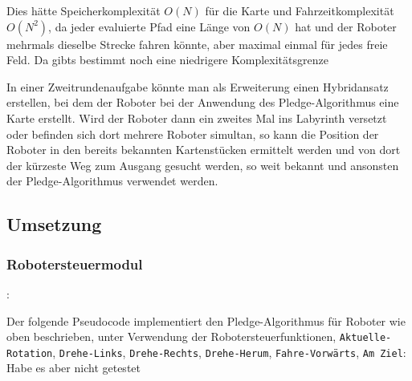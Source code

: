 \documentclass[10pt,a4paper]{article}
\newcommand{\notsure}[1]{{\color{red} #1}}
\begin{document}
Dies hätte Speicherkomplexität $O(N)$ für die Karte und Fahrzeitkomplexität $O(N^2)$, da jeder evaluierte Pfad eine Länge von $O(N)$ hat und der Roboter mehrmals dieselbe Strecke fahren könnte, aber maximal einmal für jedes freie Feld. \notsure{Da gibts bestimmt noch eine niedrigere Komplexitätsgrenze} %
 
\vspace{0.5cm}
 
In einer Zweitrundenaufgabe könnte man als Erweiterung einen Hybridansatz erstellen, bei dem der Roboter bei der Anwendung des Pledge-Algorithmus eine Karte erstellt. Wird der Roboter dann ein zweites Mal ins Labyrinth versetzt oder  befinden sich dort mehrere Roboter simultan, so kann die Position der Roboter in den bereits bekannten Kartenstücken ermittelt werden und von dort der kürzeste Weg zum Ausgang gesucht werden, so weit bekannt und ansonsten der Pledge-Algorithmus verwendet werden.
  
\subsection{Umsetzung}


\newcommand{\RobotRotation}{\texttt{Aktuelle-Rotation}}
\newcommand{\RobotTurnLeft}{\texttt{Drehe-Links}}
\newcommand{\RobotTurnRight}{\texttt{Drehe-Rechts}}
\newcommand{\RobotTurnAround}{\texttt{Drehe-Herum}}
\newcommand{\RobotMoveForward}{\texttt{Fahre-Vorwärts}}
\newcommand{\RobotWon}{\texttt{Am Ziel}}


\subsubsection{Robotersteuermodul}:

Der folgende Pseudocode implementiert den Pledge-Algorithmus für Roboter wie oben beschrieben, unter Verwendung der Robotersteuerfunktionen, \RobotRotation, \RobotTurnLeft, \RobotTurnRight, \RobotTurnAround, \RobotMoveForward, \RobotWon: \notsure{Habe es aber nicht getestet}
\end{document}
